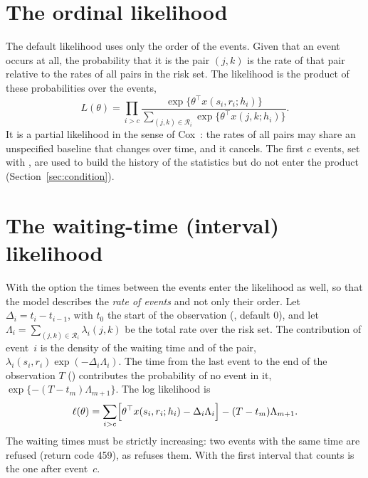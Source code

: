 \section{The ordinal likelihood}\label{sec:ordinal}

The default likelihood uses only the order of the events. Given that an event occurs at all, the probability that it is the pair $(j,k)$ is the rate of that pair relative to the rates of all pairs in the risk set. The likelihood is the product of these probabilities over the events,
\begin{equation}\label{eq:ordinal}
L(\theta)=\prod_{i>c}\frac{\exp\{\theta^{\top}x(s_i,r_i;h_i)\}}{\sum_{(j,k)\in\mathcal R_i}\exp\{\theta^{\top}x(j,k;h_i)\}} .
\end{equation}
It is a partial likelihood in the sense of Cox~\cite{cox1972}: the rates of all pairs may share an unspecified baseline that changes over time, and it cancels. The first $c$ events, set with , are used to build the history of the statistics but do not enter the product (Section~\ref{sec:condition}).

\section{The waiting-time (interval) likelihood}\label{sec:interval-model}

With the option  the times between the events enter the likelihood as well, so that the model describes the \emph{rate of events} and not only their order. Let $\Delta_i=t_i-t_{i-1}$, with $t_0$ the start of the observation (, default $0$), and let $\Lambda_i=\sum_{(j,k)\in\mathcal R_i}\lambda_i(j,k)$ be the total rate over the risk set. The contribution of event~$i$ is the density of the waiting time and of the pair, $\lambda_i(s_i,r_i)\exp(-\Delta_i\Lambda_i)$. The time from the last event to the end of the observation $T$ () contributes the probability of no event in it, $\exp\{-(T-t_m)\Lambda_{m+1}\}$. The log likelihood is
\begin{equation}\label{eq:interval}
\ell(\theta)=\sum_{i>c}\Bigl[\theta^{\top}x(s_i,r_i;h_i)-\Delta_i\Lambda_i\Bigr]-(T-t_m)\Lambda_{m+1}.
\end{equation}
The waiting times must be strictly increasing: two events with the same time are refused (return code 459), as \relevent{} refuses them. With  the first interval that counts is the one after event~$c$.

